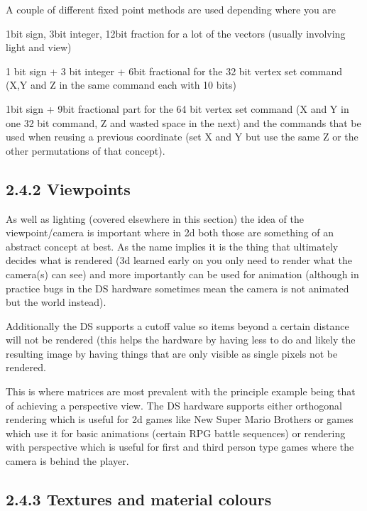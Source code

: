 \documentclass[
]{book}
\begin{document}
A couple of different fixed point methods are used depending where you are

1bit sign, 3bit integer, 12bit fraction for a lot of the vectors (usually involving light and view)

1 bit sign + 3 bit integer + 6bit fractional for the 32 bit vertex set command (X,Y and Z in the same command each with 10 bits)

1bit sign + 9bit fractional part for the 64 bit vertex set command (X and Y in one 32 bit command, Z and wasted space in the next) and the commands that be used when reusing a previous coordinate (set X and Y but use the same Z or the other permutations of that concept).

\hypertarget{viewpoints}{%
\subsection{2.4.2 Viewpoints}\label{viewpoints}}

As well as lighting (covered elsewhere in this section) the idea of the viewpoint/camera is important where in 2d both those are something of an abstract concept at best. As the name implies it is the thing that ultimately decides what is rendered (3d learned early on you only need to render what the camera(s) can see) and more importantly can be used for animation (although in practice bugs in the DS hardware sometimes mean the camera is not animated but the world instead).

Additionally the DS supports a cutoff value so items beyond a certain distance will not be rendered (this helps the hardware by having less to do and likely the resulting image by having things that are only visible as single pixels not be rendered.

This is where matrices are most prevalent with the principle example being that of achieving a perspective view. The DS hardware supports either orthogonal rendering which is useful for 2d games like New Super Mario Brothers or games which use it for basic animations (certain RPG battle sequences) or rendering with perspective which is useful for first and third person type games where the camera is behind the player.

\hypertarget{textures-and-material-colours}{%
\subsection{2.4.3 Textures and material colours}\label{textures-and-material-colours}}
\end{document}
